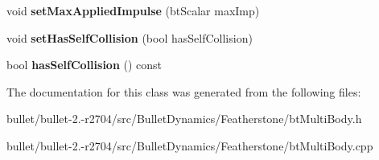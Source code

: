 \begin{DoxyCompactItemize}
\item 
\hypertarget{classbt_multi_body_a0d79a9b5c5371b661b7692ee3d4a9e75}{void {\bfseries set\+Max\+Applied\+Impulse} (bt\+Scalar max\+Imp)}\label{classbt_multi_body_a0d79a9b5c5371b661b7692ee3d4a9e75}

\item 
\hypertarget{classbt_multi_body_a4c7bc3057da41bae8fa8873ea9dbb191}{void {\bfseries set\+Has\+Self\+Collision} (bool has\+Self\+Collision)}\label{classbt_multi_body_a4c7bc3057da41bae8fa8873ea9dbb191}

\item 
\hypertarget{classbt_multi_body_ad15ae1d616f08d2591ee01e8134dcd3e}{bool {\bfseries has\+Self\+Collision} () const }\label{classbt_multi_body_ad15ae1d616f08d2591ee01e8134dcd3e}

\end{DoxyCompactItemize}


The documentation for this class was generated from the following files\+:\begin{DoxyCompactItemize}
\item 
bullet/bullet-\/2.-\/r2704/src/\+Bullet\+Dynamics/\+Featherstone/bt\+Multi\+Body.\+h\item 
bullet/bullet-\/2.-\/r2704/src/\+Bullet\+Dynamics/\+Featherstone/bt\+Multi\+Body.\+cpp\end{DoxyCompactItemize}
